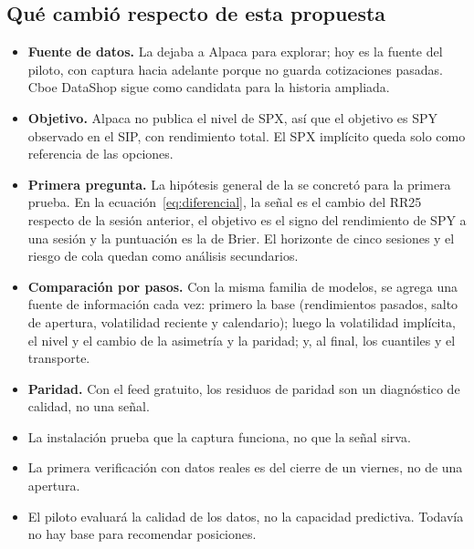 \subsection{Qué cambió respecto de esta propuesta}\label{sec:estado_cambios}

\begin{itemize}
\item \textbf{Fuente de datos.} La  dejaba a Alpaca para explorar; hoy es la fuente del
piloto, con captura hacia adelante porque no guarda cotizaciones pasadas. Cboe DataShop sigue como
candidata para la historia ampliada.
\item \textbf{Objetivo.} Alpaca no publica el nivel de SPX, así que el objetivo es SPY observado en el SIP, con
rendimiento total. El SPX implícito queda solo como referencia de las opciones.
\item \textbf{Primera pregunta.} La hipótesis general de la  se concretó para la primera
prueba. En la ecuación~\eqref{eq:diferencial}, la señal es el cambio del RR25 respecto de la sesión anterior,
el objetivo es el signo del rendimiento de SPY a una sesión y la puntuación es la de Brier. El horizonte de
cinco sesiones y el riesgo de cola quedan como análisis secundarios.
\item \textbf{Comparación por pasos.} Con la misma familia de modelos, se agrega una fuente de información
cada vez: primero la base (rendimientos pasados, salto de apertura, volatilidad reciente y calendario);
luego la volatilidad implícita, el nivel y el cambio de la asimetría y la paridad; y, al final, los
cuantiles y el transporte.
\item \textbf{Paridad.} Con el feed gratuito, los residuos de paridad son un diagnóstico de calidad, no una
señal.
\end{itemize}

\begin{noconcluirfinal}
\begin{itemize}
\item La instalación prueba que la captura funciona, no que la señal sirva.
\item La primera verificación con datos reales es del cierre de un viernes, no de una apertura.
\item El piloto evaluará la calidad de los datos, no la capacidad predictiva. Todavía no hay base para
recomendar posiciones.
\end{itemize}
\end{noconcluirfinal}

